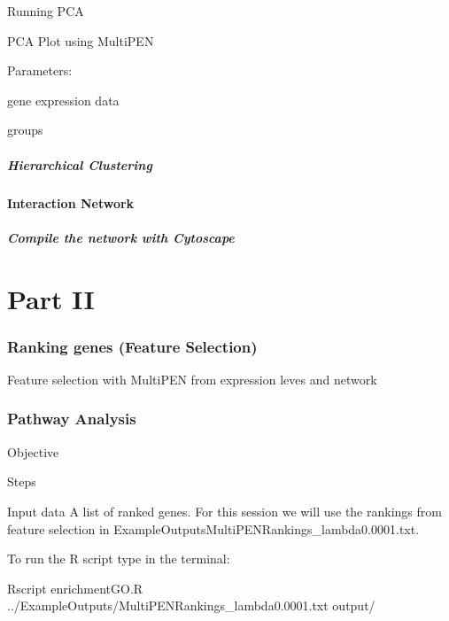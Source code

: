 \documentclass[11pt, oneside]{article}   	%
\begin{document}
Running PCA

%
%
%
%



PCA Plot using MultiPEN

Parameters:

gene expression data

groups



\subsubsection{Hierarchical Clustering}

\subsection{Interaction Network}
\subsubsection{Compile the network with Cytoscape}


\part{Part II}
\section{Ranking genes (Feature Selection)} 

Feature selection with MultiPEN from expression leves and network 


\section{Pathway Analysis}

Objective

Steps

Input data
A list of ranked genes. For this session we will use the rankings from feature selection in ExampleOutputs\/MultiPEN\-Rankings\_lambda0.0001.txt.

To run the R script type in the terminal:

Rscript enrichmentGO.R ../ExampleOutputs/MultiPEN\-Rankings\_lambda0.0001.txt output/
\end{document}
